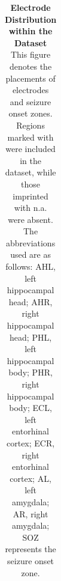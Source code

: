 \documentclass[final,3p,times,twocolumn]{elsarticle}
\begin{document}
\begin{table}[htbp]
\begin{tabular}{*{11}{c}}
\\
\bottomrule
\end{tabular}
\captionsetup{width=\textwidth}
\caption{\textbf{
Electrode Distribution within the Dataset
}
\smallskip
\\
This figure denotes the placements of electrodes and seizure onset zones. Regions marked with \checkmark were included in the dataset, while those imprinted with n.a. were absent. The abbreviations used are as follows: AHL, left hippocampal head; AHR, right hippocampal head; PHL, left hippocampal body; PHR, right hippocampal body; ECL, left entorhinal cortex; ECR, right entorhinal cortex; AL, left amygdala; AR, right amygdala; SOZ represents the seizure onset zone.
}
\label{tab:01}
\end{table}
\restoregeometry
\end{document}
